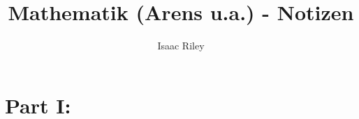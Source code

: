 \documentclass[a4paper]{article}
\title{Mathematik (Arens u.a.) - Notizen}
\author{Isaac Riley}
\begin{document}
\maketitle
\tableofcontents
\newpage

\section*{Part I: }

\section{}

\subsection{}

\subsubsection{}


\section{}

\section{}

\section{}

\section{}

\section{}
\end{document}
